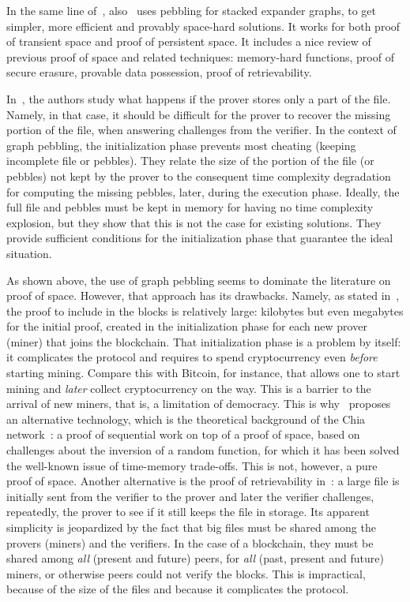 In the same line of~\cite{AtenieseBFG14,DziembowskiFKP15}, also~\cite{RenD16} uses
pebbling for stacked expander graphs, to get simpler, more efficient and
provably space-hard solutions.
It works for both proof of transient space and proof of persistent space.
It includes a nice review of previous proof of space
and related techniques: memory-hard functions, proof of secure erasure, provable data possession,
proof of retrievability.

In~\cite{Reyzin23}, the authors study what happens if the prover stores only a part of the file.
Namely, in that case, it should be difficult for the prover to recover the
missing portion of the file, when answering challenges from the verifier.
In the context of graph pebbling, the initialization phase prevents most cheating
(keeping incomplete file or pebbles). They relate the size
of the portion of the file (or pebbles) not kept by the prover to the consequent time complexity degradation
for computing the missing pebbles, later, during the execution phase.
Ideally, the full file and pebbles must be kept in memory
for having no time complexity explosion, but they show that this is not the case for existing solutions.
They provide sufficient conditions for the initialization phase that guarantee the ideal situation.

As shown above, the use of graph pebbling seems to dominate the literature on proof of space.
However, that approach has its drawbacks.
Namely, as stated in~\cite{AbusalahACKPR17}, the proof to include in the blocks is relatively large:
kilobytes but even megabytes for the initial proof, created in the initialization phase for each new
prover (miner) that joins the blockchain. That initialization phase is a problem by itself: it complicates
the protocol and requires to spend cryptocurrency even \emph{before}
starting mining. Compare this with Bitcoin, for instance, that allows one to start mining
and \emph{later} collect cryptocurrency on the way. This is a barrier to the arrival of new
miners, that is, a limitation of democracy.
This is why~\cite{AbusalahACKPR17} proposes an alternative technology, which is the
theoretical background of the Chia network~\cite{Chia}:
a proof of sequential work on top of a proof of space, based on challenges
about the inversion of a random function, for which it has been solved
the well-known issue of time-memory trade-offs. This is not, however, a pure proof of space.
Another alternative is the proof of retrievability in~\cite{JuelsK07}: a large file
is initially sent from the verifier to the prover and later the verifier
challenges, repeatedly, the prover to see if it still keeps the file in storage.
Its apparent simplicity
is jeopardized by the fact that big files must be shared among the provers (miners) and
the verifiers. In the case of a blockchain, they must be shared among \emph{all} (present and future)
peers, for \emph{all} (past, present and future) miners, or otherwise peers could not verify the blocks.
This is impractical, because of the size of the files and because it complicates the protocol.

